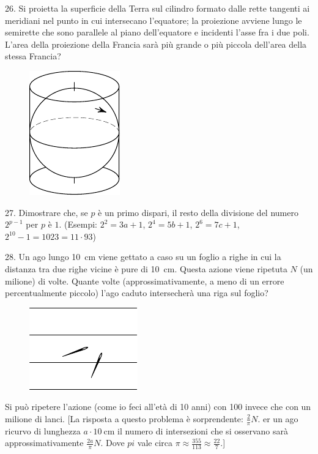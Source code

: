 \begin{problem}{26.}
	Si proietta la superficie della Terra sul cilindro formato dalle rette tangenti ai meridiani nel punto in cui intersecano l’equatore; la proiezione avviene lungo le semirette che sono parallele al piano dell’equatore e incidenti l’asse fra i due poli. L’area della proiezione della Francia sarà più grande o più piccola dell’area della stessa Francia?
	\begin{figure}
		\includegraphics{resources/taskbook-10}
	\end{figure}
\end{problem}

\begin{problem}{27.}
	Dimostrare che, se $p$ è un primo dispari, il resto della divisione del numero  $2^{p-1}$ per $p$ è $1$.
	(Esempi: $2^2 = 3a + 1$, $2^4 = 5b+1$, $2^6 = 7c+1$, $2^{10} - 1 = 1023 = 11\cdot 93$)
\end{problem}

\begin{problem}{28.}
	Un ago lungo \SI{10}{\cm} viene gettato a caso su un foglio a righe in cui la distanza tra due righe vicine è pure di \SI{10}{\cm}. Questa azione viene ripetuta $N$ (un milione) di volte.
	Quante volte (approssimativamente, a meno di un errore percentualmente piccolo) l’ago caduto intersecherà una riga sul foglio?
	\begin{figure}
		\includegraphics{resources/taskbook-12}
	\end{figure}
	Si può ripetere l’azione (come io feci all’età di 10 anni) con 100 invece che con un milione di lanci. [La risposta a questo problema è sorprendente:  $\frac2{\pi}N$. er un ago ricurvo di lunghezza $a \cdot \SI{10}{\cm}$ il numero di intersezioni che si osservano sarà approssimativamente $\frac{2a}{\pi}N$.
	Dove  $pi$ vale circa  $\pi \approx  \frac{355}{113} \approx \frac{22}7.$]
\end{problem}

